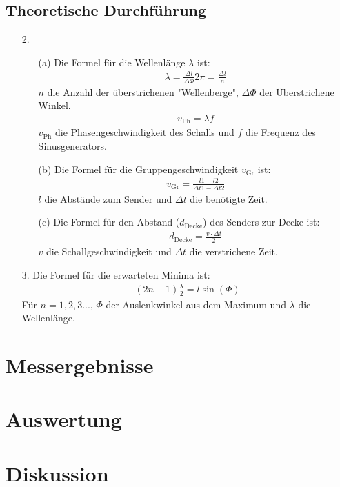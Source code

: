 \documentclass[12pt]{scrartcl}
\begin{document}
\subsection{Theoretische Durchführung}
\begin{enumerate}
\item[2.]
\begin{enumerate}
\item[(a)]
Die Formel für die Wellenlänge $\lambda$ ist:
\begin{align}
\lambda = \frac{\Delta l}{\Delta \Phi} 2\pi
= \frac{\Delta l}{n}
\end{align}
$n$ die Anzahl der überstrichenen "Wellenberge", $\Delta \Phi$ der Überstrichene Winkel.
\begin{align}
v_{\text{Ph}} = \lambda f
\end{align}
$v_{\text{Ph}}$ die Phasengeschwindigkeit des Schalls und $f$ die Frequenz des Sinusgenerators.
\item[(b)]
Die Formel für die Gruppengeschwindigkeit $v_{\text{Gr}}$ ist:
\begin{align}
v_{\text{Gr}} = \frac{l1-l2}{\Delta t1 - \Delta t2}
\end{align}
$l$ die Abstände zum Sender und $\Delta t$ die benötigte Zeit.
\item[(c)]
Die Formel für den Abstand ($d_{\text{Decke}}$) des Senders zur Decke ist:
\begin{align}
d_{\text{Decke}} = \frac{v \cdot \Delta t}{2}
\end{align}
$v$ die Schallgeschwindigkeit und $\Delta t$ die verstrichene Zeit.
\end{enumerate}

\item[3.]
Die Formel für die erwarteten Minima ist:
\begin{align}
(2n-1)\frac{\lambda}{2} = l \sin(\Phi)
\end{align}
Für $n = 1,2,3...$, $\Phi$ der Auslenkwinkel aus dem Maximum und $\lambda$ die Wellenlänge.

\end{enumerate}

\section{Messergebnisse}



\section{Auswertung}


\section{Diskussion}


\end{document}
